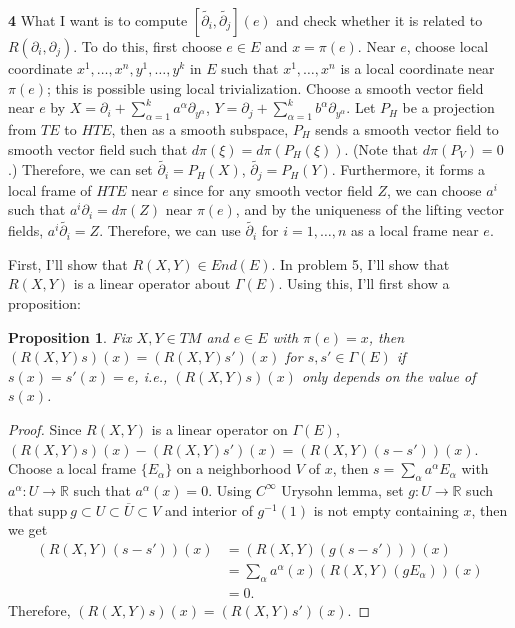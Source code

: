 \documentclass[a4paper, 12pt]{article}
\theoremstyle{Mydefinition}
\theoremstyle{Mytheorem}
\newtheorem{proposition}[statement]{Proposition}
\begin{document}
\noindent \textbf{4}
What I want is to compute $[\tilde{\partial_i}, \tilde{\partial_j}](e)$ and check whether it is related to $R(\partial_i, \partial_j)$. To do this, first choose $e\in E$ and $x=\pi(e)$. Near $e$, choose local coordinate $x^1, \ldots, x^n, y^1, \ldots, y^k$ in $E$ such that $x^1, \ldots, x^n$ is a local coordinate near $\pi(e)$; this is possible using local trivialization. Choose a smooth vector field near $e$ by $X = \partial_i + \sum_{\alpha=1}^k a^\alpha \partial_{y^\alpha}$, $Y = \partial_j + \sum_{\alpha=1}^k b^\alpha \partial_{y^\alpha}$. Let $P_H$ be a projection from $TE$ to $HTE$, then as a smooth subspace, $P_H$ sends a smooth vector field to smooth vector field such that $d\pi(\xi) = d\pi(P_H(\xi))$. (Note that $d\pi(P_V)=0$.) Therefore, we can set $\tilde{\partial_i} = P_H(X)$, $\tilde{\partial_j} = P_H(Y)$. Furthermore, it forms a local frame of $HTE$ near $e$ since for any smooth vector field $Z$, we can choose $a^i$ such that $a^i \partial_i = d\pi(Z)$ near $\pi(e)$, and by the uniqueness of the lifting vector fields, $a^i \tilde{\partial_i} = Z$. Therefore, we can use $\tilde{\partial_i}$ for $i=1,\ldots, n$ as a local frame near $e$.

First, I'll show that $R(X,Y)\in End(E)$. In problem 5, I'll show that $R(X,Y)$ is a linear operator about $\Gamma(E)$. Using this, I'll first show a proposition:
\begin{proposition}
Fix $X,Y\in TM$ and $e\in E$ with $\pi(e) = x$, then $(R(X,Y)s)(x)=(R(X,Y)s')(x)$ for $s,s'\in \Gamma(E)$ if $s(x)=s'(x) = e$, i.e., $(R(X,Y)s)(x)$ only depends on the value of $s(x)$.
\end{proposition}

\begin{proof}
Since $R(X,Y)$ is a linear operator on $\Gamma(E)$, $(R(X,Y)s)(x)-(R(X,Y)s')(x) = (R(X,Y)(s-s'))(x)$. Choose a local frame $\{E_\alpha\}$ on a neighborhood $V$ of $x$, then $s=\sum_{\alpha} a^\alpha E_\alpha$ with $a^\alpha:U\rightarrow \mathbb{R}$ such that $a^\alpha(x) = 0$. Using $C^\infty$ Urysohn lemma, set $g:U\rightarrow \mathbb{R}$ such that $\textrm{supp}~g\subset U\subset \overline{U}\subset V$ and interior of $g^{-1}(1)$ is not empty containing $x$, then we get
\begin{equation*}
\begin{split}
    (R(X,Y)(s-s'))(x) &= (R(X,Y)(g(s-s')))(x)\\
    &=\sum_\alpha a^\alpha(x) (R(X,Y)(g E_\alpha))(x)\\
    &=0.
\end{split}
\end{equation*}
Therefore, $(R(X,Y)s)(x) = (R(X,Y)s')(x)$.
\end{proof}
\end{document}
